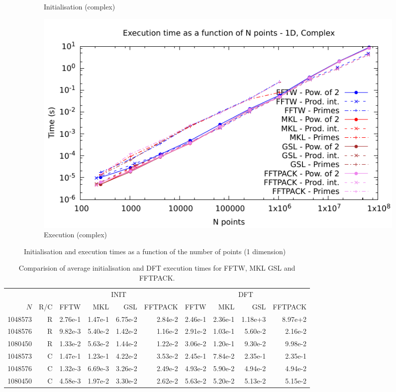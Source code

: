 \documentclass[12pt, a4paper]{article} \setlength{\textheight}{24cm}
\begin{document}
\begin{figure}[H]
\begin{subfigure}{.5\textwidth}
    \caption{Initialisation (complex)}
    \label{1DCI}
  \end{subfigure}%
  \begin{subfigure}{.5\textwidth}
    \centering
    \includegraphics[width=.9\linewidth]{graphs/1d-exec-c.pdf}
    \caption{Execution (complex)}
    \label{1DC}
  \end{subfigure}
  \caption{Initialisation and execution times as a function of the
    number of points (1 dimension)}
  \label{1D}
\end{figure}

\begin{tiny}
  \begin{table}[H]
    \captionsetup{width=0.8\linewidth}
    \centering
    \begin{tabular}{|rr|rrrr|rrrr|}
      \hline
      \multicolumn{2}{|c|}{ }& \multicolumn{4}{|c|}{INIT } & \multicolumn{4}{|c|}{DFT }  \\
      $N$ & R/C & FFTW & MKL & GSL & FFTPACK & FFTW & MKL & GSL & FFTPACK \\
      \hline
      \hline
      1048573 & R & 2.76e-1 & 1.47e-1 & 6.75e-2 & 2.84e-2 & 2.46e-1 & 2.36e-1 & 1.18e+3 & 8.97e+2 \\
      1048576 & R &  9.82e-3 & 5.40e-2 &  1.42e-2 &      1.16e-2 &    2.91e-2 &   1.03e-1 &  5.60e-2 & 2.16e-2 \\ 
      1080450 & R & 1.33e-2 & 5.63e-2  & 1.44e-2  & 1.22e-2  & 3.06e-2 & 1.20e-1 & 9.30e-2 & 9.98e-2  \\  
      \hline
      1048573 & C & 1.47e-1 & 1.23e-1 & 4.22e-2 & 3.53e-2 & 2.45e-1 & 7.84e-2 &  2.35e-1 & 2.35e-1 \\
      1048576 & C & 1.32e-3 &  6.69e-3 &      3.26e-2 & 2.49e-2 & 4.93e-2 &  5.90e-2 &  4.94e-2 &   4.94e-2  \\
      1080450 & C &  4.58e-3 & 1.97e-2  & 3.30e-2  & 2.62e-2 & 5.63e-2 & 5.20e-2 & 5.13e-2 & 5.15e-2 \\
      \hline
    \end{tabular}
    \caption{Comparision of average initialisation and DFT execution times for FFTW, MKL GSL and FFTPACK.}\label{Tbl:1D}
  \end{table}
\end{tiny}
\end{document}
